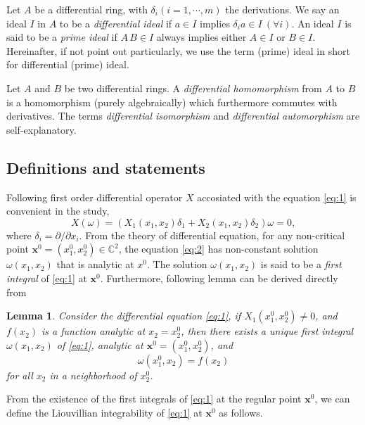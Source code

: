 \documentclass[preprint, 12pt]{elsarticle}
\newtheorem{lem}[thm]{Lemma}
\numberwithin{equation}{section}
\newcommand{\Comp}{\mathbb{C}}
\begin{document}
Let $A$ be a differential ring, with $\delta_i (i = 1,\cdots,m)$
the derivations. We say an ideal $I$ in $A$ to be a
\textit{differential ideal} if $a\in I$ implies $\delta_i a\in I\
(\forall i)$. An ideal $I$ is said to be a \textit{prime ideal} if
$A\,B\in I$ always implies either $A\in I$ or $B\in I$. Hereinafter,
if not point out particularly, we use the term (prime) ideal in
short for differential (prime) ideal.

Let $A$ and $B$ be two differential rings. A \textit{differential
homomorphism} from $A$ to $B$ is a homomorphism (purely
algebraically) which furthermore commutes with derivatives. The
terms \textit{differential isomorphism} and \textit{differential
automorphism} are self-explanatory.

\subsection{Definitions and statements}
\label{sec:0.2} 
Following first order differential operator $X$ accosiated with the equation \eqref{eq:1} is  convenient in the study,
\begin{equation}
\label{eq:2} X(\omega) = (X_1(x_1,x_2)\delta_1 +
X_2(x_1,x_2)\delta_2)\omega = 0,
\end{equation}
where $\delta_i = \partial/\partial x_i$. From the theory of
differential equation\cite[pp.510-513]{Kaplan:58}, for any
non-critical point $\mathbf{x}^0 = (x_1^0,x_2^0)\in\Comp^2$, the equation \eqref{eq:2} has 
non-constant solution $\omega(x_1,x_2)$
that is analytic at $x^0$. The solution $\omega(x_1,x_2)$ is said
to be a \textit{first integral} of \eqref{eq:1} at $\mathbf{x}^0$.
Furthermore, following lemma can be derived directly from
\cite[Theorem 1, pp. 98]{AB:89}
\begin{lem}
\label{pro:1} Consider the differential equation \eqref{eq:1}, if
$X_1(x_1^0,x_2^0) \not= 0$, and $f(x_2)$ is a function analytic at $x_2 = x_2^0$, then there exists a unique first integral
$\omega(x_1, x_2)$ of \eqref{eq:1}, analytic at $\mathbf{x}^0 =
(x_1^0,x_2^0)$, and
$$\omega(x_1^0, x_2) = f(x_2)$$
for all $x_2$ in a neighborhood of $x_2^0$.
\end{lem}

From the existence of the first integrals of \eqref{eq:1} at
the regular point $\mathbf{x}^0$, we can define the Liouvillian
integrability of \eqref{eq:1} at $\mathbf{x}^0$ as follows.
\end{document}
